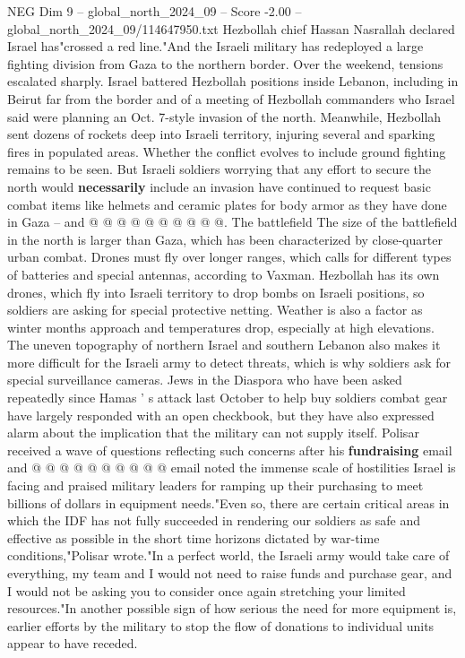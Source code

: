 \begin{textsample}{NEG Dim 9 – global\_north\_2024\_09 – Score -2.00 – global\_north\_2024\_09/114647950.txt}
Hezbollah chief Hassan Nasrallah declared Israel has"crossed a red line."And the Israeli military has redeployed a large fighting division from Gaza to the northern border.
Over the weekend, tensions escalated sharply.
Israel battered Hezbollah positions inside Lebanon, including in Beirut far from the border and of a meeting of Hezbollah commanders who Israel said were planning an Oct. 7-style invasion of the north.
Meanwhile, Hezbollah sent dozens of rockets deep into Israeli territory, injuring several and sparking fires in populated areas.
Whether the conflict evolves to include ground fighting remains to be seen.
But Israeli soldiers worrying that any effort to secure the north would \textbf{necessarily} include an invasion have continued to request basic combat items like helmets and ceramic plates for body armor as they have done in Gaza -- and @ @ @ @ @ @ @ @ @ @.
The battlefield The size of the battlefield in the north is larger than Gaza, which has been characterized by close-quarter urban combat.
Drones must fly over longer ranges, which calls for different types of batteries and special antennas, according to Vaxman.
Hezbollah has its own drones, which fly into Israeli territory to drop bombs on Israeli positions, so soldiers are asking for special protective netting.
Weather is also a factor as winter months approach and temperatures drop, especially at high elevations.
The uneven topography of northern Israel and southern Lebanon also makes it more difficult for the Israeli army to detect threats, which is why soldiers ask for special surveillance cameras.
Jews in the Diaspora who have been asked repeatedly since Hamas ' s attack last October to help buy soldiers combat gear have largely responded with an open checkbook, but they have also expressed alarm about the implication that the military can not supply itself.
Polisar received a wave of questions reflecting such concerns after his \textbf{fundraising} email and @ @ @ @ @ @ @ @ @ @ email noted the immense scale of hostilities Israel is facing and praised military leaders for ramping up their purchasing to meet billions of dollars in equipment needs."Even so, there are certain critical areas in which the IDF has not fully succeeded in rendering our soldiers as safe and effective as possible in the short time horizons dictated by war-time conditions,"Polisar wrote."In a perfect world, the Israeli army would take care of everything, my team and I would not need to raise funds and purchase gear, and I would not be asking you to consider once again stretching your limited resources."In another possible sign of how serious the need for more equipment is, earlier efforts by the military to stop the flow of donations to individual units appear to have receded.

\end{textsample}
